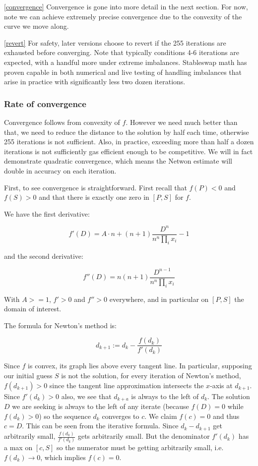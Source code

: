 \documentclass[
]{article}
\begin{document}
\ref{convergence} Convergence is gone into more detail in the next
section. For now, note we can achieve extremely precise convergence due
to the convexity of the curve we move along.

\ref{revert} For safety, later versions choose to revert if the 255
iterations are exhausted before converging. Note that typically
conditions 4-6 iterations are expected, with a handful more under
extreme imbalances. Stableswap math has proven capable in both numerical
and live testing of handling imbalances that arise in practice with
significantly less two dozen iterations.

\hypertarget{rate-of-convergence}{%
\subsubsection{Rate of convergence}\label{rate-of-convergence}}

Convergence follows from convexity of \(f\). However we need much better
than that, we need to reduce the distance to the solution by half each
time, otherwise 255 iterations is not sufficient. Also, in practice,
exceeding more than half a dozen iterations is not sufficiently gas
efficient enough to be competitive. We will in fact demonstrate
quadratic convergence, which means the Netwon estimate will double in
accuracy on each iteration.

First, to see convergence is straightforward. First recall that
\(f(P) < 0\) and \(f(S) > 0\) and that there is exactly one zero in
\([P, S]\) for \(f\).

We have the first derivative:

\[ f'(D) = A\cdot n + (n+1) \frac{D^n}{n^n \prod_i x_i} - 1 \]

and the second derivative:

\[ f''(D) = n (n+1) \frac{D^{n-1}}{n^n \prod_i x_i} \]

With \(A >= 1\), \(f' > 0\) and \(f'' > 0\) everywhere, and in
particular on \([P, S]\) the domain of interest.

The formula for Newton's method is:

\[ d_{k+1} := d_k - \frac{f(d_k)}{f'(d_k)} \]

Since \(f\) is convex, its graph lies above every tangent line. In
particular, supposing our initial guess \(S\) is not the solution, for
every iteration of Newton's method, \(f(d_{k+1}) > 0\) since the tangent
line approximation intersects the \(x\)-axis at \(d_{k+1}\). Since
\(f'(d_k) > 0\) also, we see that \(d_{k+a}\) is always to the left of
\(d_k\). The solution \(D\) we are seeking is always to the left of any
iterate (because \(f(D) = 0\) while \(f(d_k) > 0\)) so the sequence
\(d_k\) converges to \(c\). We claim \(f(c) = 0\) and thus \(c = D\).
This can be seen from the iterative formula. Since \(d_{k} - d_{k+1}\)
get arbitrarily small, \(\frac{f(d_k)}{f'(d_k)}\) gets arbitrarily
small. But the denominator \(f'(d_k)\) has a max on \([c, S]\) so the
numerator must be getting arbitrarily small,
i.e.~\(f(d_k) \rightarrow 0\), which implies \(f(c) = 0\).
\end{document}
